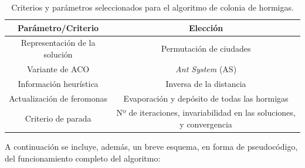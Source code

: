\begin{table}[H]
\renewcommand{\arraystretch}{1.3}
\caption{Criterios y parámetros seleccionados para el algoritmo de colonia de hormigas.}
\label{tab:aco_decisions}
\begin{center}
\begin{tabular}{|c|c|}
\hline
\textbf{Parámetro/Criterio} & \textbf{Elección} \\
\hline
Representación de la solución & Permutación de ciudades \\
\hline
Variante de ACO & \textit{Ant System} (AS) \\
\hline
Información heurística & Inversa de la distancia \\
\hline
Actualización de feromonas & Evaporación y depósito de todas las hormigas \\
\hline
Criterio de parada & Nº de iteraciones, invariabilidad en las soluciones, y convergencia \\
\hline
\end{tabular}
\end{center}
\end{table}

A continuación se incluye, además, un breve esquema, en forma de pseudocódigo, del funcionamiento completo del algoritmo:

\vspace{1.5em}

\begin{algorithm}[H]
\caption{Pseudocódigo del algoritmo de colonia de hormigas propuesto para el TSP}
\label{alg:aco}
\DontPrintSemicolon


\end{algorithm}

